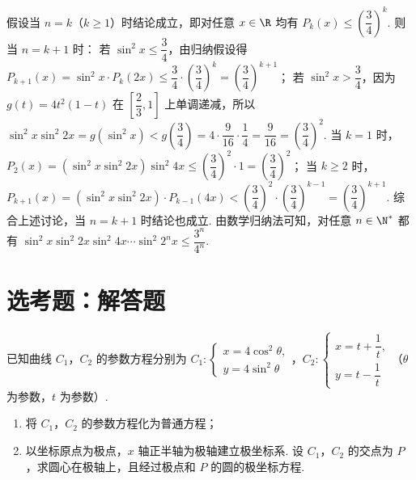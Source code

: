 \begin{solution}
\begin{enumerate}
假设当 \(n=k\)（\(k\ge1\)）时结论成立，即对任意 \(x\in\R\) 均有 \(P_k(x)\le\left(\dfrac34\right)^k\).
则当 \(n=k+1\) 时：
若 \(\sin^2 x\le\dfrac34\)，由归纳假设得 \(P_{k+1}(x)=\sin^2 x\cdot P_k(2x)\le\dfrac34\cdot\left(\dfrac34\right)^k=\left(\dfrac34\right)^{k+1}\)；
若 \(\sin^2 x>\dfrac34\)，因为 \(g(t)=4t^2(1-t)\) 在 \(\left[\dfrac23,1\right]\) 上单调递减，所以 \(\sin^2 x\sin^2 2x=g(\sin^2 x)<g\left(\dfrac34\right)=4\cdot\dfrac{9}{16}\cdot\dfrac14=\dfrac{9}{16}=\left(\dfrac34\right)^2\).
当 \(k=1\) 时，\(P_2(x)=(\sin^2 x\sin^2 2x)\sin^2 4x\le\left(\dfrac34\right)^2\cdot1=\left(\dfrac34\right)^2\)；
当 \(k\ge2\) 时，\(P_{k+1}(x)=(\sin^2 x\sin^2 2x)\cdot P_{k-1}(4x)<\left(\dfrac34\right)^2\cdot\left(\dfrac34\right)^{k-1}=\left(\dfrac34\right)^{k+1}\).
综合上述讨论，当 \(n=k+1\) 时结论也成立.
由数学归纳法可知，对任意 \(n\in\N^*\) 都有 \(\sin^2 x\sin^2 2x\sin^2 4x\cdots\sin^2 2^n x\le\dfrac{3^n}{4^n}\).
\end{enumerate}
\end{solution}

\section{选考题：解答题}

\begin{problem}
已知曲线 \(C_1\)，\(C_2\) 的参数方程分别为 \(C_1:\begin{cases}
x=4\cos^2\theta,\\
y=4\sin^2\theta
\end{cases}\)，\(C_2:\begin{cases}
x=t+\dfrac{1}{t},\\
y=t-\dfrac{1}{t}
\end{cases}\)（\(\theta\) 为参数，\(t\) 为参数）.

\begin{enumerate}
\item 将 \(C_1\)，\(C_2\) 的参数方程化为普通方程；
\item 以坐标原点为极点，\(x\) 轴正半轴为极轴建立极坐标系. 设 \(C_1\)，\(C_2\) 的交点为 \(P\)，求圆心在极轴上，且经过极点和 \(P\) 的圆的极坐标方程.
\end{enumerate}
\end{problem}

